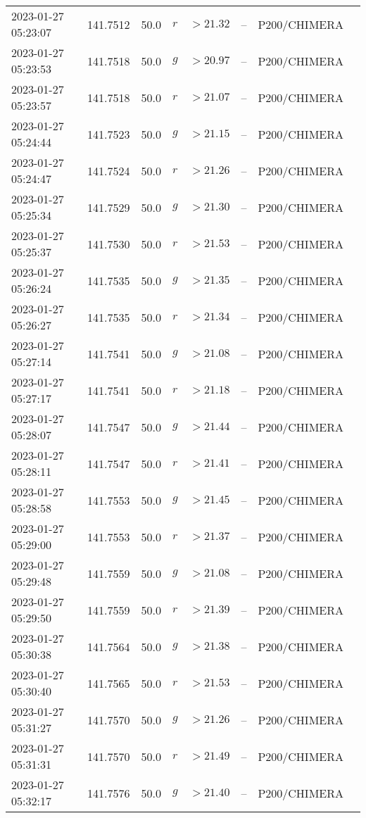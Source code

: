 \documentclass{nature_plusfigure}
\begin{document}
\begin{supplement}
\begin{center}
\begin{longtable}{llllllll}
2023-01-27 05:23:07 & 141.7512 & 50.0 & $r$ & $>21.32$ & -- & P200/CHIMERA &  \\ 
2023-01-27 05:23:53 & 141.7518 & 50.0 & $g$ & $>20.97$ & -- & P200/CHIMERA &  \\ 
2023-01-27 05:23:57 & 141.7518 & 50.0 & $r$ & $>21.07$ & -- & P200/CHIMERA &  \\ 
2023-01-27 05:24:44 & 141.7523 & 50.0 & $g$ & $>21.15$ & -- & P200/CHIMERA &  \\ 
2023-01-27 05:24:47 & 141.7524 & 50.0 & $r$ & $>21.26$ & -- & P200/CHIMERA &  \\ 
2023-01-27 05:25:34 & 141.7529 & 50.0 & $g$ & $>21.30$ & -- & P200/CHIMERA &  \\ 
2023-01-27 05:25:37 & 141.7530 & 50.0 & $r$ & $>21.53$ & -- & P200/CHIMERA &  \\ 
2023-01-27 05:26:24 & 141.7535 & 50.0 & $g$ & $>21.35$ & -- & P200/CHIMERA &  \\ 
2023-01-27 05:26:27 & 141.7535 & 50.0 & $r$ & $>21.34$ & -- & P200/CHIMERA &  \\ 
2023-01-27 05:27:14 & 141.7541 & 50.0 & $g$ & $>21.08$ & -- & P200/CHIMERA &  \\ 
2023-01-27 05:27:17 & 141.7541 & 50.0 & $r$ & $>21.18$ & -- & P200/CHIMERA &  \\ 
2023-01-27 05:28:07 & 141.7547 & 50.0 & $g$ & $>21.44$ & -- & P200/CHIMERA &  \\ 
2023-01-27 05:28:11 & 141.7547 & 50.0 & $r$ & $>21.41$ & -- & P200/CHIMERA &  \\ 
2023-01-27 05:28:58 & 141.7553 & 50.0 & $g$ & $>21.45$ & -- & P200/CHIMERA &  \\ 
2023-01-27 05:29:00 & 141.7553 & 50.0 & $r$ & $>21.37$ & -- & P200/CHIMERA &  \\ 
2023-01-27 05:29:48 & 141.7559 & 50.0 & $g$ & $>21.08$ & -- & P200/CHIMERA &  \\ 
2023-01-27 05:29:50 & 141.7559 & 50.0 & $r$ & $>21.39$ & -- & P200/CHIMERA &  \\ 
2023-01-27 05:30:38 & 141.7564 & 50.0 & $g$ & $>21.38$ & -- & P200/CHIMERA &  \\ 
2023-01-27 05:30:40 & 141.7565 & 50.0 & $r$ & $>21.53$ & -- & P200/CHIMERA &  \\ 
2023-01-27 05:31:27 & 141.7570 & 50.0 & $g$ & $>21.26$ & -- & P200/CHIMERA &  \\ 
2023-01-27 05:31:31 & 141.7570 & 50.0 & $r$ & $>21.49$ & -- & P200/CHIMERA &  \\ 
2023-01-27 05:32:17 & 141.7576 & 50.0 & $g$ & $>21.40$ & -- & P200/CHIMERA &  \\ 

\end{longtable}
\end{center}
\end{supplement}
\end{document}
